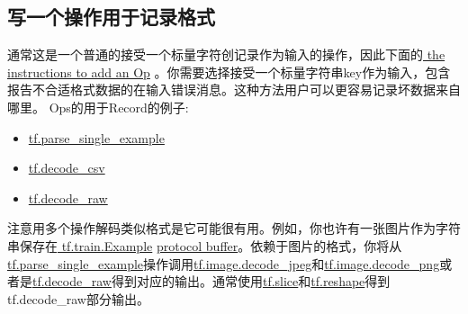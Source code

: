 \subsection{写一个操作用于记录格式}
通常这是一个普通的接受一个标量字符创记录作为输入的操作，因此下面的\href{https://www.tensorflow.org/extend/adding_an_op}{ the instructions to add an Op}
。你需要选择接受一个标量字符串key作为输入，包含报告不合适格式数据的在输入错误消息。这种方法用户可以更容易记录坏数据来自哪里。
Ops的用于Record的例子:
\begin{itemize} 
\item \href{https://www.tensorflow.org/api_docs/python/tf/parse_single_example}{tf.parse\_single\_example}
\item \href{https://www.tensorflow.org/api_docs/python/tf/decode_csv}{tf.decode\_csv}
\item \href{https://www.tensorflow.org/api_docs/python/tf/decode_raw}{tf.decode\_raw}
\end{itemize}
注意用多个操作解码类似格式是它可能很有用。例如，你也许有一张图片作为字符串保存在\href{https://www.github.com/tensorflow/tensorflow/blob/r1.4/tensorflow/core/example/example.proto}{ tf.train.Example} \href{https://www.github.com/tensorflow/tensorflow/blob/r1.4/tensorflow/core/example/example.proto}{protocol buffer}。依赖于图片的格式，你将从\href{https://www.tensorflow.org/api_docs/python/tf/parse_single_example}{tf.parse\_single\_example}操作调用\href{https://www.tensorflow.org/api_docs/python/tf/image/decode_jpeg}{tf.image.decode\_jpeg}和\href{https://www.tensorflow.org/api_docs/python/tf/image/decode_png}{tf.image.decode\_png}或者是\href{https://www.tensorflow.org/api_docs/python/tf/decode_raw}{tf.decode\_raw}得到对应的输出。通常使用\href{https://www.tensorflow.org/api_docs/python/tf/slice}{tf.slice}和\href{https://www.tensorflow.org/api_docs/python/tf/reshape}{tf.reshape}得到tf.decode\_raw部分输出。
